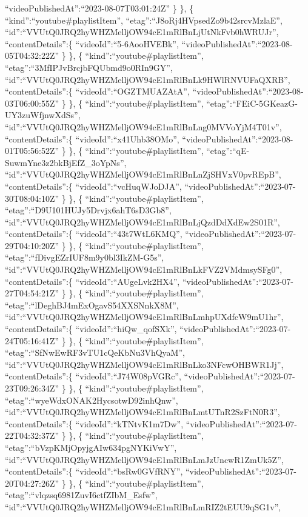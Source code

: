 \documentclass[11pt]{article}
\begin{document}
``videoPublishedAt'':``2023-08-07T03:01:24Z'' \} \}, \{
``kind'':``youtube\#playlistItem'',
``etag'':``J8oRj4HVpsedZo9b42srcvMzlaE'',
``id'':``VVUtQ0JRQ2hyWHZMelljOW94cE1mRlBnLjUtNkFvb0hWRUJr'',
``contentDetails'':\{ ``videoId'':``5-6AooHVEBk'',
``videoPublishedAt'':``2023-08-05T04:32:22Z'' \} \}, \{
``kind'':``youtube\#playlistItem'',
``etag'':``3MfIPJvBrcjbFQUbmd9o0RIn9GY'',
``id'':``VVUtQ0JRQ2hyWHZMelljOW94cE1mRlBnLk9HWlRNVUFaQXRB'',
``contentDetails'':\{ ``videoId'':``OGZTMUAZAtA'',
``videoPublishedAt'':``2023-08-03T06:00:55Z'' \} \}, \{
``kind'':``youtube\#playlistItem'',
``etag'':``FEiC-5GKeazG-UY3zuWfjnwXdSs'',
``id'':``VVUtQ0JRQ2hyWHZMelljOW94cE1mRlBnLng0MVVoYjM4T01v'',
``contentDetails'':\{ ``videoId'':``x41Uhb38OMo'',
``videoPublishedAt'':``2023-08-01T05:56:52Z'' \} \}, \{
``kind'':``youtube\#playlistItem'',
``etag'':``qE-SuwmYne3z2bkBjEfZ\_3oYpNs'',
``id'':``VVUtQ0JRQ2hyWHZMelljOW94cE1mRlBnLnZjSHVxV0pvREpB'',
``contentDetails'':\{ ``videoId'':``vcHuqWJoDJA'',
``videoPublishedAt'':``2023-07-30T08:04:10Z'' \} \}, \{
``kind'':``youtube\#playlistItem'',
``etag'':``D9U101HUJy5Drvjx6ahT6sD3Gb8'',
``id'':``VVUtQ0JRQ2hyWHZMelljOW94cE1mRlBnLjQzdDdXdEw2S01R'',
``contentDetails'':\{ ``videoId'':``43t7WtL6KMQ'',
``videoPublishedAt'':``2023-07-29T04:10:20Z'' \} \}, \{
``kind'':``youtube\#playlistItem'',
``etag'':``fDivgEZrIUF8m9y0bl3IkZM-G5s'',
``id'':``VVUtQ0JRQ2hyWHZMelljOW94cE1mRlBnLkFVZ2VMdmsySFg0'',
``contentDetails'':\{ ``videoId'':``AUgeLvk2HX4'',
``videoPublishedAt'':``2023-07-27T04:54:21Z'' \} \}, \{
``kind'':``youtube\#playlistItem'',
``etag'':``lDeghBJ4mExOgavS54XXSNnkX8M'',
``id'':``VVUtQ0JRQ2hyWHZMelljOW94cE1mRlBnLmhpUXdfcW9mU1hr'',
``contentDetails'':\{ ``videoId'':``hiQw\_qofSXk'',
``videoPublishedAt'':``2023-07-24T05:16:41Z'' \} \}, \{
``kind'':``youtube\#playlistItem'',
``etag'':``SfNwEwRF3vTU1cQeKbNu3VhQyaM'',
``id'':``VVUtQ0JRQ2hyWHZMelljOW94cE1mRlBnLko3NFcwOHBWR1Jj'',
``contentDetails'':\{ ``videoId'':``J74W08pVGRc'',
``videoPublishedAt'':``2023-07-23T09:26:34Z'' \} \}, \{
``kind'':``youtube\#playlistItem'',
``etag'':``wyeWdxONAK2HycsotwD92inhQnw'',
``id'':``VVUtQ0JRQ2hyWHZMelljOW94cE1mRlBnLmtUTnR2SzFtN0R3'',
``contentDetails'':\{ ``videoId'':``kTNtvK1m7Dw'',
``videoPublishedAt'':``2023-07-22T04:32:37Z'' \} \}, \{
``kind'':``youtube\#playlistItem'',
``etag'':``bVzpKMjOpyjgAIw634pgNYKiVwY'',
``id'':``VVUtQ0JRQ2hyWHZMelljOW94cE1mRlBnLmJzUncwR1ZmUk5Z'',
``contentDetails'':\{ ``videoId'':``bsRw0GVfRNY'',
``videoPublishedAt'':``2023-07-20T04:27:26Z'' \} \}, \{
``kind'':``youtube\#playlistItem'',
``etag'':``vlqzsq6981ZuvI6ctfZIbM\_Esfw'',
``id'':``VVUtQ0JRQ2hyWHZMelljOW94cE1mRlBnLmRIZ2tEUU9qSG1v'',
\end{document}
